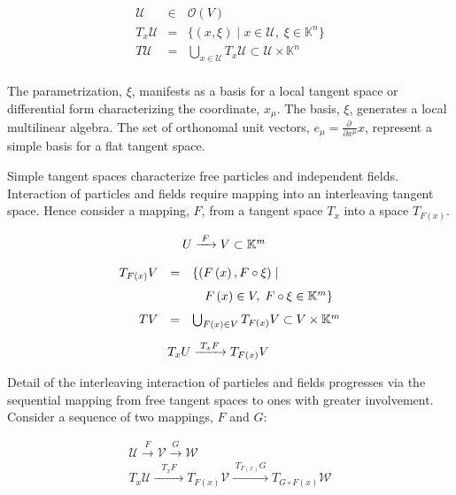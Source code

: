 \documentclass[aps,twocolumn,secnumarabic,nobalancelastpage,amsmath,amssymb,
amsthm,nofootinbib,parskip=full]{revtex4}
\numberwithin{equation}{section}
\newcommand{\mapaob}[3]{{#1}\xrightarrow{\;{#2}\;}{#3}}
\newcommand{\pa}[1]{\left(#1\right)}
\begin{document}
\begin{equation*}
\begin{array}{rcl}
\mathscr{U}&\in&\mathscr{O}\pa{V} \\[7pt]
T_x\mathscr{U}&=&\{\pa{x,\xi}\mid x\in\mathscr{U},\;
                  \xi\in \mathbb{K}^n\} \\[7pt]
T\mathscr{U}&=&\bigcup_{x\in\mathscr{U}} T_x\mathscr{U}
  \subset\mathscr{U}\times\mathbb{K}^n \\[7pt]
\end{array}
\end{equation*}

The parametrization, $\xi$, manifests as a basis for a local tangent space
or differential form characterizing the coordinate, $x_\mu$. The basis, $\xi$,
generates a local multilinear algebra. The set of orthonomal unit vectors,
$e_\mu=\frac{\partial\;}{\partial x^\mu}x$, represent a simple basis for a
flat tangent space.

Simple tangent spaces characterize free particles and independent fields.
Interaction of particles and fields require mapping into an interleaving
tangent space. Hence consider a mapping, $F$, from a tangent
space $T_x$ into a space $T_{F\pa{x}}$.

\begin{equation*}
\begin{array}{rcl}
&&\hspace{-8pt}\mapaob{\mathscr{U}}{F}{\mathscr{V}}\subset\mathbb{K}^m \\[11pt]
T_{F\pa{x}}\mathscr{V}&=&\{\pa{F\pa{x},F\circ\xi}\mid \\[7pt]
                          &&\quad F\pa{x}\in\mathscr{V},\;
                  F\circ\xi\in \mathbb{K}^m\} \\[7pt]
T\mathscr{V}&=&\bigcup_{F\pa{x}\in\mathscr{V}} T_{F\pa{x}}\mathscr{V}
  \subset\mathscr{V}\times\mathbb{K}^m \\[11pt]
&&\hspace{-20pt}\mapaob{T_x\mathscr{U}}{T_xF}{T_{F\pa{x}}\mathscr{V}}
\end{array}
\end{equation*}

Detail of the interleaving interaction of particles and fields
progresses via the sequential mapping from free tangent spaces to
ones with greater involvement. Consider a sequence of two mappings,
$F$ and $G$:

\begin{equation*}
\begin{array}{c}
\mapaob{\mathscr{U}}{F}{\mapaob{\mathscr{V}}{G}{\mathscr{W}}} \\[11pt]
\mapaob{T_x\mathscr{U}}{\;\;T_xF\;\;}{
  \mapaob{T_{F\pa{x}}\mathscr{V}}
  {T_{F\pa{x}}G}{T_{G\circ F\pa{x}}\mathscr{W}}} \\[11pt]
\end{array}
\end{equation*}
\end{document}
